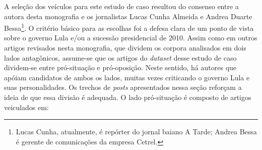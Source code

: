 A seleção dos veículos para este estudo de caso resultou do consenso entre a autora desta monografia e os jornalistas Lucas Cunha Almeida e Andrea Duarte Bessa\footnote{Lucas Cunha, atualmente, é repórter do jornal baiano A Tarde; Andrea Bessa é gerente de comunicações da empresa Cetrel.}. O critério básico para as escolhas foi a defesa clara de um ponto de vista sobre o governo Lula e/ou a sucessão presidencial de 2010. Assim como em outros artigos revisados nesta monografia, que dividem os corpora analisados em dois lados antagônicos, assume-se que os artigos do \emph{dataset} desse estudo de caso dividem-se entre pró-situação e pró-oposição. Neste sentido, há autores que apóiam candidatos de ambos os lados, muitas vezes criticando o governo Lula e suas personalidades. Os trechos de \emph{posts} apresentados nessa seção reforçam a ideia de que essa divisão é adequada. O lado pró-situação é composto de artigos veiculados em:


